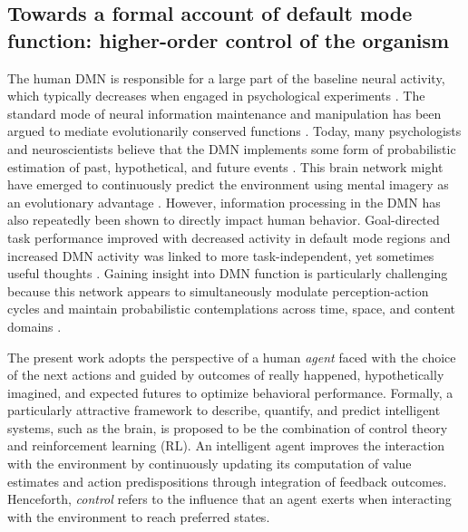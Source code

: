 \documentclass[10pt,letterpaper]{article}
\begin{document}
\subsection{Towards a formal account of default mode function: higher-order control of the organism}
The human DMN is responsible for a large part of the baseline neural activity,
which typically decreases when engaged in psychological experiments
\citep{raichle_baseline}.
The standard mode of
neural information maintenance and manipulation has
been argued to mediate evolutionarily conserved functions
\citep{brown1914nature, binder1999conceptual, buzsaki2006rhythms}.
Today, many psychologists and neuroscientists believe that
the DMN implements some form of
probabilistic estimation of past, hypothetical, and
future events
\citep{fox2005, hassabis2007patients, schacter2007remembering, binder2009,
randy2008, spreng2009common}.
This brain network
might have emerged to continuously predict the environment using
mental imagery as an evolutionary advantage \citep{suddendorf2007evolution}.
%
However, information processing in the DMN has also repeatedly
been shown to directly impact human behavior. Goal-directed task performance
improved with decreased activity in default mode regions \citep{weiss2006}
and increased DMN activity was linked to more task-independent,
yet sometimes useful thoughts
\citep{mason2007, seli2016mind}.
%
Gaining insight into DMN function is
particularly challenging because
this network appears to
simultaneously modulate perception-action cycles and
maintain probabilistic contemplations
across time, space, and content domains
\citep{boyer2008evolutionary}.


The present work adopts the perspective of
a human \textit{agent} faced with the choice of the next actions
and guided by outcomes
of really happened, hypothetically imagined, and
expected futures to optimize behavioral performance.
Formally, a particularly attractive framework
to describe, quantify, and predict intelligent systems, such as the brain,
is proposed to be the combination of control theory and
reinforcement learning (RL).
An intelligent agent improves the interaction with the environment
by continuously updating its computation of value estimates and action predispositions
through integration of feedback outcomes.
Henceforth,
\textit{control} refers to the influence that an agent exerts when interacting
with the environment to reach preferred states.
\end{document}
